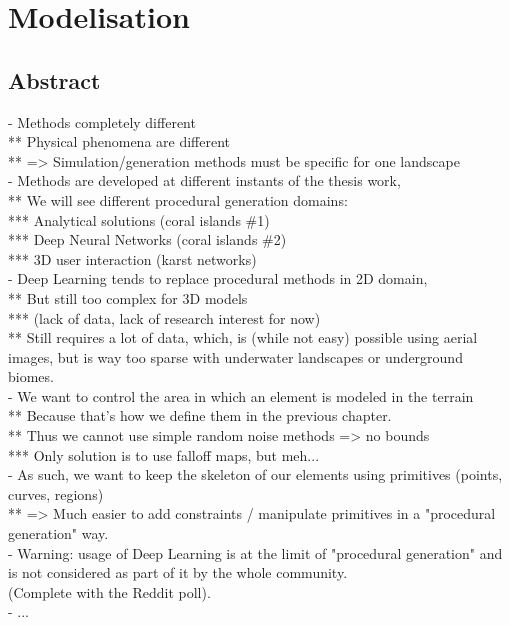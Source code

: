 \part{Modelisation}

\chapter*{Abstract}
\label{chap:modelisation-abstract}
- Methods completely different \\
** Physical phenomena are different \\
** => Simulation/generation methods must be specific for one landscape \\
- Methods are developed at different instants of the thesis work, \\
** We will see different procedural generation domains: \\
*** Analytical solutions (coral islands \#1) \\
*** Deep Neural Networks (coral islands \#2) \\
*** 3D user interaction (karst networks) \\
- Deep Learning tends to replace procedural methods in 2D domain, \\
** But still too complex for 3D models \\
*** (lack of data, lack of research interest for now) \\
** Still requires a lot of data, which, is (while not easy) possible using aerial images, but is way too sparse with underwater landscapes or underground biomes. \\
- We want to control the area in which an element is modeled in the terrain \\
** Because that's how we define them in the previous chapter. \\
** Thus we cannot use simple random noise methods => no bounds \\
*** Only solution is to use falloff maps, but meh... \\
- As such, we want to keep the skeleton of our elements using primitives (points, curves, regions) \\
** => Much easier to add constraints / manipulate primitives in a "procedural generation" way. \\
- Warning: usage of Deep Learning is at the limit of "procedural generation" and is not considered as part of it by the whole community. \\
(Complete with the Reddit poll). \\
- ... 






